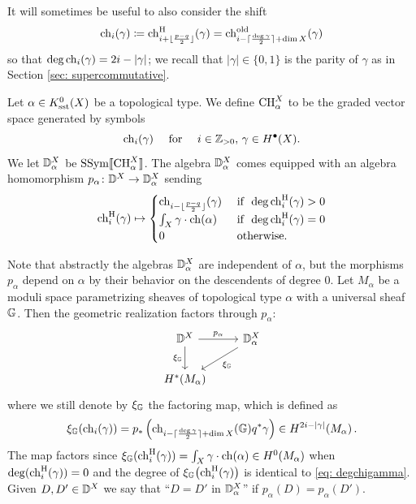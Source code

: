 \documentclass[a4paper, 12pt]{amsart}
\begin{document}
It will sometimes be useful to also consider the shift
\[\mathrm{ch}_{i}(\gamma)\coloneqq \mathrm{ch}^{\mathrm{H}}_{i+\lfloor\frac{p-q}{2}\rfloor}(\gamma)=\mathrm{ch}^{\textup{old}}_{i-\lceil\frac{\deg \gamma}{2}\rceil+\dim X}(\gamma)\]
so that $\deg\mathrm{ch}_i(\gamma)=2i-|\gamma|$; we recall that $|\gamma|\in \{0,1\}$ is the parity of $\gamma$ as in Section \ref{sec: supercommutative}. 
\begin{definition}\label{def: topdescendentalgebra}
Let $\alpha\in K_{\text{sst}}^0(X)$ be a topological type. We define $\text{CH}^X_\alpha$ to be the graded vector space generated by symbols \[\mathrm{ch}_i(\gamma)\quad\textup{ for }\quad i\in {\mathbb{Z}}_{>0},\,\gamma\in H^\bullet(X).\]
We let ${\mathbb{D}}^X_\alpha$ be $\text{SSym}\llbracket \text{CH}^X_\alpha\rrbracket$. The algebra ${\mathbb{D}}^X_\alpha$ comes equipped with an algebra homomorphism
$p_\alpha\colon {\mathbb{D}}^X\to {\mathbb{D}}^X_\alpha$
sending
\[\mathrm{ch}_i^{\mathrm{H}}(\gamma)\mapsto\begin{cases}
\mathrm{ch}_{i-\lfloor\frac{p-q}{2}\rfloor}(\gamma) &\textup{ if } \,\deg\mathrm{ch}_i^{\mathrm{H}}(\gamma)>0\\
\int_X \gamma\cdot \mathrm{ch}(\alpha) &\textup{ if } \,\deg\mathrm{ch}_i^{\mathrm{H}}(\gamma)=0\\
0&\textup{ otherwise.}
\end{cases}\]
\end{definition}

Note that abstractly the algebras ${\mathbb{D}}^X_\alpha$ are independent of $\alpha$, but the morphisms $p_\alpha$ depend on $\alpha$ by their behavior on the descendents of degree 0. Let $M_\alpha$ be a moduli space parametrizing sheaves of topological type $\alpha$ with a universal sheaf ${\mathbb{G}}$. Then the geometric realization factors through $p_\alpha$:
\begin{equation}
\label{Eq: descentofrealization}
\begin{tikzcd}
\BD^X\arrow[r,"p_{\alpha}"]\arrow[d,swap, "\xi_{\BG}"]& \BD^{X}_\alpha \arrow[dl,"\xi_{\BG}"]\\
H^\ast(M_\alpha)&
\end{tikzcd}
\end{equation} 
where we still denote by $\xi_{\mathbb{G}}$ the factoring map, which is defined as
\begin{equation}\label{eq: geometricrealizationalpha}
\xi_{{\mathbb{G}}}(\mathrm{ch}_i(\gamma))=p_\ast\left(\mathrm{ch}_{i-\lceil\frac{\deg \gamma}{2}\rceil+\dim X}({\mathbb{G}})q^\ast \gamma\right)\in H^{2i-|\gamma|}(M_\alpha)\,.
\end{equation}
The map factors since 
$\xi_{{\mathbb{G}}}(\mathrm{ch}^{\mathrm{H}}_i(\gamma))=\int_X \gamma\cdot \mathrm{ch}(\alpha)\in H^0(M_\alpha)$ when $\deg(\mathrm{ch}^{\mathrm{H}}_i(\gamma))=0$ and the degree of $\xi_{{\mathbb{G}}}\big(\mathrm{ch}^{\mathrm{H}}_i(\gamma)\big)$ is identical to \eqref{eq: degchigamma}. Given $D, D'\in {\mathbb{D}}^X$ we say that ``$D=D'$ in ${\mathbb{D}}^X_\alpha$'' if $p_\alpha(D)=p_\alpha(D')$.
\end{document}
